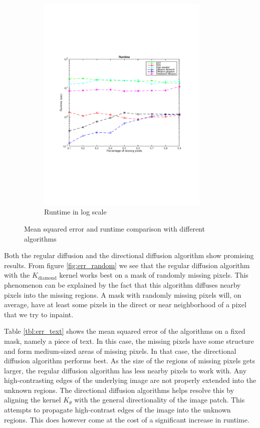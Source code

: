 \begin{figure}
\begin{subfigure}[b]{0.49\textwidth}
		\includegraphics[clip, trim=2cm 7cm 2cm 6cm, width=0.9\textwidth]{figures/runtime_vector}
		\caption{Runtime in log scale}
		\label{fig:runtime}
	\end{subfigure}
	
	\caption{Mean squared error and runtime comparison with different algorithms}
	\label{fig:results}
\end{figure}


Both the regular diffusion and the directional diffusion algorithm show promising results. From figure \ref{fig:err_random} we see that the regular diffusion algorithm with the $K_{\text{diamond}}$ kernel works best on a mask of randomly missing pixels. This phenomenon can be explained by the fact that this algorithm diffuses nearby pixels into the missing regions. A mask with randomly missing pixels will, on average, have at least some pixels in the direct or near neighborhood of a pixel that we try to inpaint.


Table \ref{tbl:err_text} shows the mean squared error of the algorithms on a fixed mask, namely a piece of text. In this case, the missing pixels have some structure and form medium-sized areas of missing pixels. In that case, the directional diffusion algorithm performs best. As the size of the regions of missing pixels gets larger, the regular diffusion algorithm has less nearby pixels to work with. Any high-contrasting edges of the underlying image are not properly extended into the unknown regions. The directional diffusion algorithms helps resolve this by aligning the kernel  $K_{\theta}$ with the general directionality of the image patch. This attempts to propagate high-contrast edges of the image into the unknown regions. This does however come at the cost of a significant increase in runtime.

